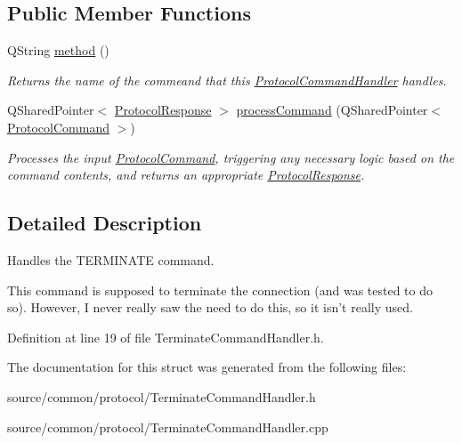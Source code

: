 \subsection*{Public Member Functions}
\begin{DoxyCompactItemize}
\item 
\hypertarget{struct_picto_1_1_terminate_command_handler_aaeddee1aa161cd3a9adcbf8057ebcb66}{Q\-String \hyperlink{struct_picto_1_1_terminate_command_handler_aaeddee1aa161cd3a9adcbf8057ebcb66}{method} ()}\label{struct_picto_1_1_terminate_command_handler_aaeddee1aa161cd3a9adcbf8057ebcb66}

\begin{DoxyCompactList}\small\item\em Returns the name of the commeand that this \hyperlink{struct_picto_1_1_protocol_command_handler}{Protocol\-Command\-Handler} handles. \end{DoxyCompactList}\item 
\hypertarget{struct_picto_1_1_terminate_command_handler_a29d749732cd87345b773c971282e2087}{Q\-Shared\-Pointer$<$ \hyperlink{struct_picto_1_1_protocol_response}{Protocol\-Response} $>$ \hyperlink{struct_picto_1_1_terminate_command_handler_a29d749732cd87345b773c971282e2087}{process\-Command} (Q\-Shared\-Pointer$<$ \hyperlink{struct_picto_1_1_protocol_command}{Protocol\-Command} $>$)}\label{struct_picto_1_1_terminate_command_handler_a29d749732cd87345b773c971282e2087}

\begin{DoxyCompactList}\small\item\em Processes the input \hyperlink{struct_picto_1_1_protocol_command}{Protocol\-Command}, triggering any necessary logic based on the command contents, and returns an appropriate \hyperlink{struct_picto_1_1_protocol_response}{Protocol\-Response}. \end{DoxyCompactList}\end{DoxyCompactItemize}


\subsection{Detailed Description}
Handles the T\-E\-R\-M\-I\-N\-A\-T\-E command. 

This command is supposed to terminate the connection (and was tested to do so). However, I never really saw the need to do this, so it isn't really used. 

Definition at line 19 of file Terminate\-Command\-Handler.\-h.



The documentation for this struct was generated from the following files\-:\begin{DoxyCompactItemize}
\item 
source/common/protocol/Terminate\-Command\-Handler.\-h\item 
source/common/protocol/Terminate\-Command\-Handler.\-cpp\end{DoxyCompactItemize}
